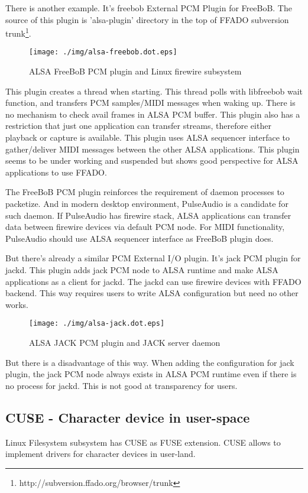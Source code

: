 \documentclass[onecolumn]{article}
\begin{document}
There is another example. It's freebob External PCM Plugin for FreeBoB. The source of this plugin is 'alsa-plugin' directory in the top of FFADO subversion trunk\footnote{http://subversion.ffado.org/browser/trunk}.

\begin{figure}[H]
	\centering
	\texttt{[image: ./img/alsa-freebob.dot.eps]}
	\caption{{ALSA FreeBoB PCM plugin and Linux firewire subsystem}}
	\label{alsa_freebob}
\end{figure}

This plugin creates a thread when starting. This thread polls with libfreebob wait function, and transfers PCM samples/MIDI messages when waking up. There is no mechanism to check avail frames in ALSA PCM buffer. This plugin also has a restriction that just one application can transfer streams, therefore either playback or capture is available. This plugin uses ALSA sequencer interface to gather/deliver MIDI messages between the other ALSA applications. This plugin seems to be under working and suspended but shows good perspective for ALSA applications to use FFADO.

The FreeBoB PCM plugin reinforces the requirement of daemon processes to packetize. And in modern desktop environment, PulseAudio is a candidate for such daemon. If PulseAudio has firewire stack, ALSA applications can transfer data between firewire devices via default PCM node. For MIDI functionality, PulseAudio should use ALSA sequencer interface as FreeBoB plugin does.

But there's already a similar PCM External I/O plugin. It's jack PCM plugin for jackd. This plugin adds jack PCM node to ALSA runtime and make ALSA applications as a client for jackd. The jackd can use firewire devices with FFADO backend. This way requires users to write ALSA configuration but need no other works.

\begin{figure}[H]
	\centering
	\texttt{[image: ./img/alsa-jack.dot.eps]}
	\caption{{ALSA JACK PCM plugin and JACK server daemon}}
	\label{alsa_jack}
\end{figure}

But there is a disadvantage of this way. When adding the configuration for jack plugin, the jack PCM node always exists in ALSA PCM runtime even if there is no process for jackd. This is not good at transparency for users.


\subsection{CUSE - Character device in user-space}
Linux Filesystem subsystem has CUSE as FUSE extension. CUSE allows to implement drivers for character devices in user-land.
\end{document}
